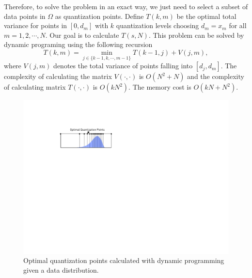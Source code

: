 \documentclass{article}
\newcommand{\err}{\ensuremath{\mathrm{err}}}
\newcommand{\setI}{\mathcal{I}}
\begin{document}

\vspace{-0.5em}
Therefore, to solve the problem in an exact way, we just need to select a subset of data points in $\Omega$ as quantization points. Define $T(k, m)$ be the optimal total variance for points in $[0, d_m]$ with $k$ quantization levels choosing $d_m=x_m$ for all $m=1,2,\cdots, N$. Our goal is to calculate $T(s, N)$. This problem can be solved by dynamic programing using the following recursion
\[
T(k, m) = \min_{j\in \{k-1, k, \cdots, m-1\}} T(k-1,j) + V(j,m),
\]
where $V(j,m)$ denotes the total variance of points falling into $[d_j, d_m]$. The complexity of calculating the matrix $V(\cdot, \cdot)$ is $O(N^2 + N)$ and the complexity of calculating matrix $T(\cdot, \cdot)$ is $O(kN^2)$. The  memory cost is $O(kN + N^2)$. 

\begin{figure}[t]
\centering    
\includegraphics[width=0.5\columnwidth]{micro-experiments/dp-level.pdf} 
\vspace{-1em}
\caption{Optimal quantization points calculated with
dynamic programming given a data distribution. }
\vspace{-1em}
\label{fig:optimalquantization}
\end{figure} 
\end{document}
